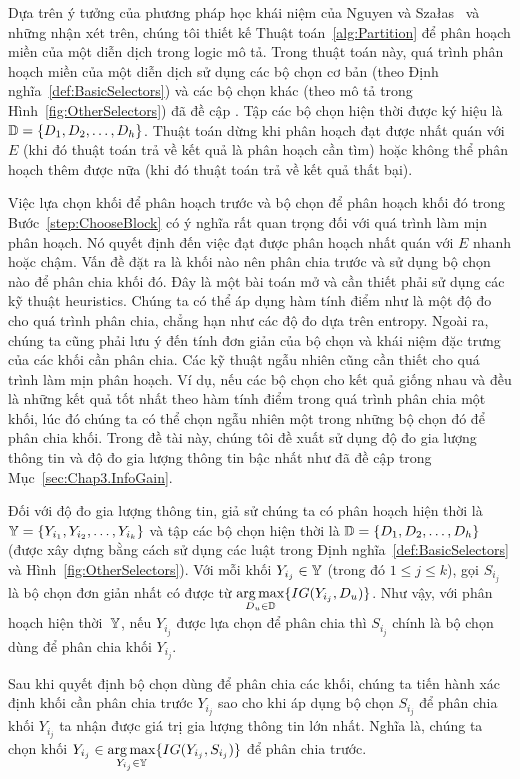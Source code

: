 Dựa trên ý tưởng của phương pháp học khái niệm của Nguyen và Sza{\l}as~\cite{Nguyen2013} và những nhận xét trên, chúng tôi thiết kế Thuật toán~\ref{alg:Partition} để phân hoạch miền của một diễn dịch trong logic mô tả.
Trong thuật toán này, quá trình phân hoạch miền của một diễn dịch sử dụng các bộ chọn cơ bản (theo Định nghĩa~\ref{def:BasicSelectors}) và các bộ chọn khác (theo mô tả trong Hình~\ref{fig:OtherSelectors}) đã đề cập . Tập các bộ chọn hiện thời được ký hiệu là $\mathbb{D} = \{D_1, D_2, \ldots, D_h\}$. Thuật toán dừng khi phân hoạch đạt được nhất quán với $E$ (khi đó thuật toán trả về kết quả là phân hoạch cần tìm) hoặc không thể phân hoạch thêm được nữa (khi đó thuật toán trả về kết quả thất bại).

Việc lựa chọn khối để phân hoạch trước và bộ chọn để phân hoạch khối đó trong Bước~\ref{step:ChooseBlock} có ý nghĩa rất quan trọng đối với quá trình làm mịn phân hoạch. 
Nó quyết định đến việc đạt được phân hoạch nhất quán với $E$ nhanh hoặc chậm. 
Vấn đề đặt ra là khối nào nên phân chia trước và sử dụng bộ chọn nào để phân chia khối đó. Đây là một bài toán mở và cần thiết phải sử dụng các kỹ thuật heuristics. Chúng ta có thể áp dụng hàm tính điểm như là một độ đo cho quá trình phân chia, chẳng hạn như các độ đo dựa trên entropy. Ngoài ra, chúng ta cũng phải lưu ý đến tính đơn giản của bộ chọn và khái niệm đặc trưng của các khối cần phân chia. Các kỹ thuật ngẫu nhiên cũng cần thiết cho quá trình làm mịn phân hoạch. Ví dụ, nếu các bộ chọn cho kết quả giống nhau và đều là những kết quả tốt nhất theo hàm tính điểm trong quá trình phân chia một khối, lúc đó chúng ta có thể chọn ngẫu nhiên một trong những bộ chọn đó để phân chia khối. Trong đề tài này, chúng tôi đề xuất sử dụng độ đo gia lượng thông tin và độ đo gia lượng thông tin bậc nhất như đã đề cập trong Mục~\ref{sec:Chap3.InfoGain}.

Đối với độ đo gia lượng thông tin, giả sử chúng ta có phân hoạch hiện thời là $\mathbb{Y}= \{Y_{i_1}, Y_{i_2}, \ldots, Y_{i_k}\}$ và tập các bộ chọn hiện thời là $\mathbb{D}=\{D_1, D_2, \ldots, D_h\}$ (được xây dựng bằng cách sử dụng các luật trong Định nghĩa~\ref{def:BasicSelectors} và Hình~\ref{fig:OtherSelectors}).
%
Với mỗi khối $Y_{i_j} \in \mathbb{Y}$ (trong đó $1 \leq j \leq k$), gọi $S_{i_j}$ là bộ chọn đơn giản nhất có được từ $\underset{D_u \in \mathbb{D}}{\arg \max}\{IG(Y_{i_j}, D_u)\}$. Như vậy, với phân hoạch hiện thời~$\mathbb{Y}$, nếu $Y_{i_j}$ được lựa chọn để phân chia thì $S_{i_j}$ chính là bộ chọn dùng để phân chia khối $Y_{i_j}$.

Sau khi quyết định bộ chọn dùng để phân chia các khối, chúng ta tiến hành xác định khối cần phân chia trước $Y_{i_j}$ sao cho khi áp dụng bộ chọn $S_{i_j}$ để phân chia khối $Y_{i_j}$ ta nhận được giá trị gia lượng thông tin lớn nhất. Nghĩa là, chúng ta chọn khối $Y_{i_j} \in \underset{Y_{i_j} \in \mathbb{Y}}{\arg \max}{\{IG(Y_{i_j}, S_{i_j})\}}$ để phân chia trước.
%

